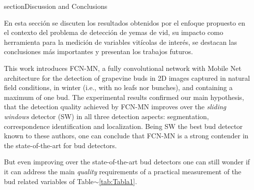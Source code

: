 \documentclass[a4paper,authoryear,review]{elsarticle}
\begin{document}

section{Discussion and Conclusions} \label{sec:discussion}

En esta sección se discuten los resultados obtenidos por el enfoque propuesto en el contexto del problema de detección de yemas de vid, su impacto como herramienta para la medición de variables vitícolas de interés, se destacan las conclusiones más importantes y presentan los trabajos futuros. 


This work introduces FCN-MN, a fully convolutional network with Mobile Net architecture \citep{long2015fully, shelhamer2017fully, siam2018rtseg} for the detection of grapevine buds in 2D images captured in natural field conditions, in winter (i.e., with no leafs nor bunches), and containing a maximum of one bud.
%
The experimental results confirmed our main hypothesis, that the detection quality achieved by FCN-MN improves over the \emph{sliding windows} detector (SW) \cite{divvala2009empirical, wang2009hog} in all three detection aspects: segmentation, correspondence identification and localization. Being SW the best bud detector known to these authors, one can conclude that FCN-MN is a strong contender in the state-of-the-art for bud detectors.




But even improving over the state-of-the-art bud detectors one can still wonder if it can address the main \emph{quality} requirements of a practical measurement of the bud related variables of Table$\sim$\ref{tab:Tabla1}.
\end{document}

